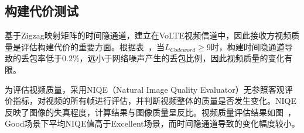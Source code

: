 \subsection{构建代价测试}
\label{chap:zigzag:results:cost}


基于Zigzag映射矩阵的时间隐通道，建立在VoLTE视频信道中，因此接收方视频质量是评估构建代价的重要方面。根据表\ ，当$L_{Codeword}\ge 9$时，构建时间隐通道导致的丢包率低于$0.2\%$，远小于网络噪声产生的丢包比例，因此视频质量的变化有限。

为评估视频质量，采用NIQE（Natural Image Quality Evaluator）无参照客观评价指标，对视频的所有帧进行评估，并判断视频整体的质量是否发生变化。NIQE反映了图像的失真程度，计算结果与图像质量呈反比。视频质量评估结果如图\ ，Good场景下平均NIQE值高于Excellent场景，而时间隐通道导致的变化幅度较小。

